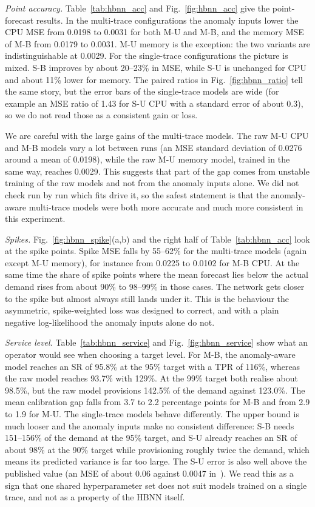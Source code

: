 \documentclass[conference]{IEEEtran}
\begin{document}
\textit{Point accuracy.}
Table~\ref{tab:hbnn_acc} and Fig.~\ref{fig:hbnn_acc} give the point-forecast results. In the multi-trace configurations the anomaly inputs lower the CPU MSE from 0.0198 to 0.0031 for both M-U and M-B, and the memory MSE of M-B from 0.0179 to 0.0031. M-U memory is the exception: the two variants are indistinguishable at 0.0029. For the single-trace configurations the picture is mixed. S-B improves by about 20--23\% in MSE, while S-U is unchanged for CPU and about 11\% lower for memory. The paired ratios in Fig.~\ref{fig:hbnn_ratio} tell the same story, but the error bars of the single-trace models are wide (for example an MSE ratio of 1.43 for S-U CPU with a standard error of about 0.3), so we do not read those as a consistent gain or loss.

We are careful with the large gains of the multi-trace models. The raw M-U CPU and M-B models vary a lot between runs (an MSE standard deviation of 0.0276 around a mean of 0.0198), while the raw M-U memory model, trained in the same way, reaches 0.0029. This suggests that part of the gap comes from unstable training of the raw models and not from the anomaly inputs alone. We did not check run by run which fits drive it, so the safest statement is that the anomaly-aware multi-trace models were both more accurate and much more consistent in this experiment.

\textit{Spikes.}
Fig.~\ref{fig:hbnn_spike}(a,b) and the right half of Table~\ref{tab:hbnn_acc} look at the spike points. Spike MSE falls by 55--62\% for the multi-trace models (again except M-U memory), for instance from 0.0225 to 0.0102 for M-B CPU. At the same time the share of spike points where the mean forecast lies below the actual demand rises from about 90\% to 98--99\% in those cases. The network gets closer to the spike but almost always still lands under it. This is the behaviour the asymmetric, spike-weighted loss was designed to correct, and with a plain negative log-likelihood the anomaly inputs alone do not.

\textit{Service level.}
Table~\ref{tab:hbnn_service} and Fig.~\ref{fig:hbnn_service} show what an operator would see when choosing a target level. For M-B, the anomaly-aware model reaches an SR of 95.8\% at the 95\% target with a TPR of 116\%, whereas the raw model reaches 93.7\% with 129\%. At the 99\% target both realise about 98.5\%, but the raw model provisions 142.5\% of the demand against 123.0\%. The mean calibration gap falls from 3.7 to 2.2 percentage points for M-B and from 2.9 to 1.9 for M-U. The single-trace models behave differently. The upper bound is much looser and the anomaly inputs make no consistent difference: S-B needs 151--156\% of the demand at the 95\% target, and S-U already reaches an SR of about 98\% at the 90\% target while provisioning roughly twice the demand, which means its predicted variance is far too large. The S-U error is also well above the published value (an MSE of about 0.06 against 0.0047 in~\cite{rossi2025}). We read this as a sign that one shared hyperparameter set does not suit models trained on a single trace, and not as a property of the HBNN itself.
\end{document}
